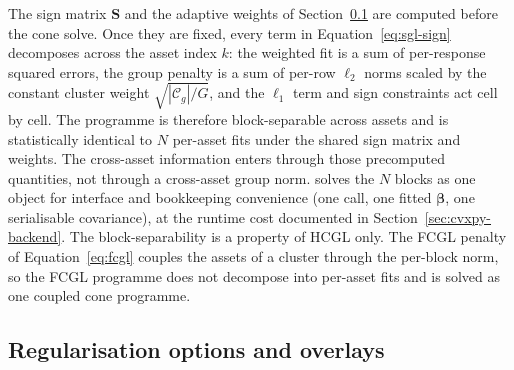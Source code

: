 \documentclass[article]{jss}
\begin{document}
The sign matrix $\bm{S}$ and the adaptive weights of
Section~\ref{sec:reg-options} are computed before the cone solve. Once
they are fixed, every term in Equation~\ref{eq:sgl-sign} decomposes
across the asset index $k$: the weighted fit is a sum of per-response
squared errors, the group penalty is a sum of per-row $\ell_2$ norms scaled
by the constant cluster weight $\sqrt{|\mathcal{C}_g| / G}$, and the
$\ell_1$ term and sign constraints act cell by cell. The programme is
therefore block-separable across assets and is statistically identical
to $N$ per-asset fits under the shared sign matrix and weights. The
cross-asset information enters through those precomputed quantities,
not through a cross-asset group norm.  solves the
$N$ blocks as one object for interface and bookkeeping convenience
(one  call, one fitted $\bm{\beta}$, one serialisable
covariance), at the runtime cost documented in
Section~\ref{sec:cvxpy-backend}. The block-separability is a property of
HCGL only. The FCGL penalty of Equation~\ref{eq:fcgl} couples the assets
of a cluster through the per-block norm, so the FCGL programme does not
decompose into per-asset fits and is solved as one coupled cone
programme.


\subsection[Regularisation options and overlays]{Regularisation options and overlays} \label{sec:reg-options}
\end{document}

